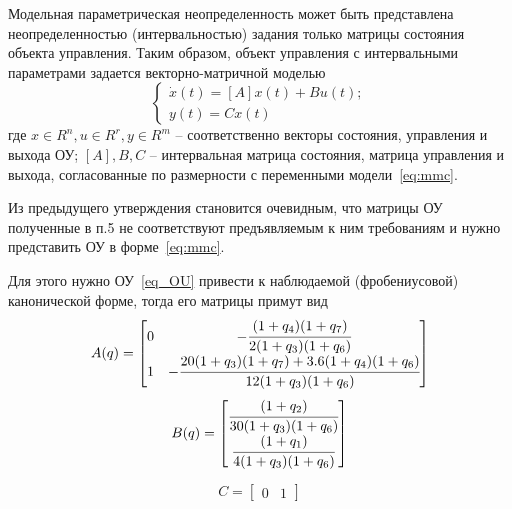 Модельная параметрическая неопределенность может быть представлена неопределенностью (интервальностью) задания только матрицы состояния объекта управления. Таким образом, объект управления с интервальными параметрами задается векторно-матричной моделью
\begin{equation}\label{eq:mmc}
	\begin{cases}
		\dot x (t) = [A] x(t) + B u(t);\\
		y(t) = C x(t)
	\end{cases}
\end{equation}
где $x \in R^n, u \in R^r, y \in R^m$ -- соответственно векторы состояния, управления и выхода ОУ; $[A], B, C$ -- интервальная матрица состояния, матрица управления и выхода, согласованные по размерности с переменными модели~\ref{eq:mmc}.

Из предыдущего утверждения становится очевидным, что матрицы ОУ полученные в п.5 не соответствуют предъявляемым к ним требованиям и нужно представить ОУ в форме~\ref{eq:mmc}.

Для этого нужно ОУ~\ref{eq_OU} привести к наблюдаемой (фробениусовой) канонической форме, тогда его матрицы примут вид
\begin{equation}\label{Aqn}
	A(q) =
	\begin{bmatrix}
	0 & - \cfrac{(1+q_4)(1+q_7)}{2(1+q_3)(1+q_6)} \\
	1 &-\cfrac{20(1+q_3)(1+q_7)+3.6(1+q_4)(1+q_6)}{12(1+q_3)(1+q_6)}
	\end{bmatrix}
\end{equation}
\begin{equation}\label{Bqn}
	B(q) =
	\begin{bmatrix}
		\cfrac{(1 + q_2)}{30(1+q_3)(1+q_6)}\\
		\cfrac{(1 + q_1)}{4(1+q_3)(1+q_6)} 
	\end{bmatrix}
\end{equation}

\begin{equation}\label{Cqn}
	C =
	\begin{bmatrix}
	0 & 1
	\end{bmatrix}
\end{equation}

